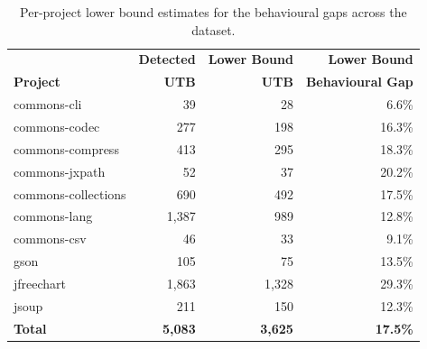 \begin{table}[h]
\centering
\caption{Per-project lower bound estimates for the behavioural gaps across the dataset.
}
\label{tab:rq2_dev}
\begin{tabular}{lrrr}
\toprule
& \textbf{Detected} & \textbf{Lower Bound} & \textbf{Lower Bound} \\
\textbf{Project} & \textbf{UTB} & \textbf{UTB} & \textbf{Behavioural Gap} \\
\midrule
commons-cli         & 39    & 28    & 6.6\% \\
commons-codec       & 277   & 198   & 16.3\% \\
commons-compress    & 413   & 295   & 18.3\% \\
commons-jxpath      & 52    & 37    & 20.2\% \\
commons-collections & 690   & 492   & 17.5\% \\
commons-lang        & 1,387 & 989   & 12.8\% \\
commons-csv         & 46    & 33    & 9.1\% \\
gson                & 105   & 75    & 13.5\% \\
jfreechart          & 1,863 & 1,328 & 29.3\% \\
jsoup               & 211   & 150   & 12.3\% \\
\midrule
\textbf{Total}      & \textbf{5,083} & \textbf{3,625} & \textbf{17.5\%} \\
\bottomrule
\end{tabular}
\end{table}


%

